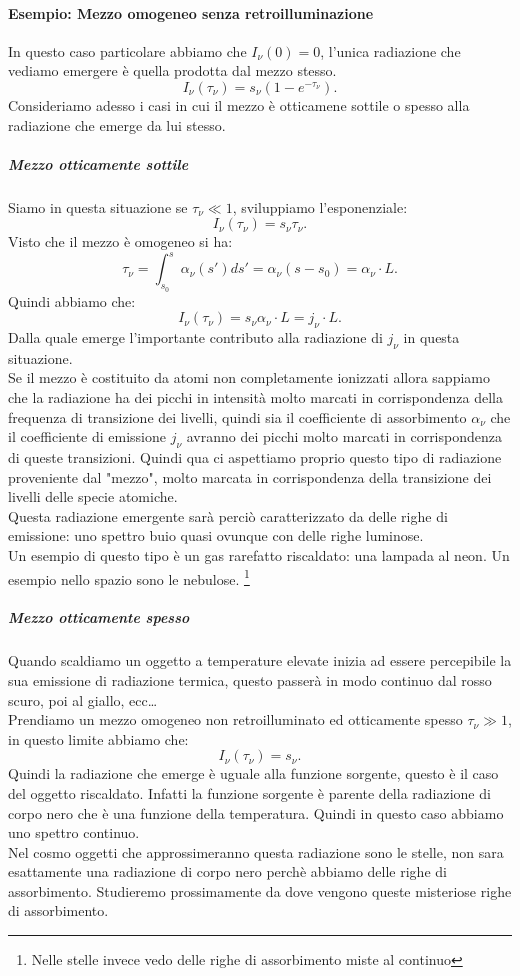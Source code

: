 \paragraph{Esempio: Mezzo omogeneo senza retroilluminazione}
In questo caso particolare abbiamo che $I_{\nu} ( 0) = 0$, l'unica radiazione che vediamo emergere è quella prodotta dal mezzo stesso.
\[
	I_{\nu} ( \tau _{\nu} ) = s_{\nu}\left( 1-e^{-\tau _{\nu} } \right)  
.\] 
Consideriamo adesso i casi in cui il mezzo è otticamene sottile o spesso alla radiazione che emerge da lui stesso.
\subparagraph{Mezzo otticamente sottile}
Siamo in questa situazione se $\tau _{\nu} \ll 1$, sviluppiamo l'esponenziale:
\[
	I_{\nu} ( \tau _{\nu} ) = s_{\nu} \tau _{\nu} 
.\] 
Visto che il mezzo è omogeneo si ha:
\[
	\tau _{\nu} = \int_{s_0}^{s} \alpha _{\nu} ( s') ds'= \alpha _{\nu} ( s-s_0)  = \alpha _{\nu} \cdot L
.\] 
Quindi abbiamo che:
\[
	I_{\nu} ( \tau _{\nu} ) = s_{\nu} \alpha _{\nu}\cdot  L = j _{\nu} \cdot L
.\] 
Dalla quale emerge l'importante contributo alla radiazione di $j _{\nu} $ in questa situazione.\\
Se il mezzo è costituito da atomi non completamente ionizzati allora sappiamo che la radiazione ha dei picchi in intensità molto marcati in corrispondenza della frequenza di transizione dei livelli, quindi sia il coefficiente di assorbimento $\alpha _{\nu} $ che il coefficiente di emissione $j _{\nu} $ avranno dei picchi molto marcati in corrispondenza di queste transizioni. Quindi qua ci aspettiamo proprio questo tipo di radiazione proveniente dal "mezzo", molto marcata in corrispondenza della transizione dei livelli delle specie atomiche. \\
Questa radiazione emergente sarà perciò caratterizzato da delle righe di emissione: uno spettro buio quasi ovunque con delle righe luminose.\\
Un esempio di questo tipo è un gas rarefatto riscaldato: una lampada al neon. Un esempio nello spazio sono le nebulose. \footnote{Nelle stelle invece vedo delle righe di assorbimento miste al continuo}
\subparagraph{Mezzo otticamente spesso}
Quando scaldiamo un oggetto a temperature elevate inizia ad essere percepibile la sua emissione di radiazione termica, questo passerà in modo continuo dal rosso scuro, poi al giallo, ecc\ldots \\
Prendiamo un mezzo omogeneo non retroilluminato ed otticamente spesso $\tau _{\nu} \gg 1$, in questo limite abbiamo che:
\[
	I_{\nu} ( \tau _{\nu} )  = s_{\nu} 
.\] 
Quindi la radiazione che emerge è uguale alla funzione sorgente, questo è il caso del oggetto riscaldato. Infatti la funzione sorgente è parente della radiazione di corpo nero che è una funzione della temperatura. Quindi in questo caso abbiamo uno spettro continuo.\\
Nel cosmo oggetti che approssimeranno questa radiazione sono le stelle, non sara esattamente una radiazione di corpo nero perchè abbiamo delle righe di assorbimento. Studieremo prossimamente da dove vengono queste misteriose righe di assorbimento.
